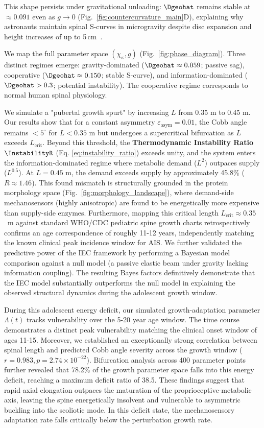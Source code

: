 \documentclass[11pt]{article}
\begin{document}
This shape persists under gravitational unloading: $\Dgeohat$ remains stable at $\approx 0.091$ even as $g \to 0$ (Fig.~\ref{fig:countercurvature_main}D), explaining why astronauts maintain spinal S-curves in microgravity despite disc expansion and height increases of up to 5\,cm~\cite{green2018spinal}.



We map the full parameter space $(\chi_\kappa, g)$ (Fig.~\ref{fig:phase_diagram}). Three distinct regimes emerge: gravity-dominated ($\Dgeohat \approx 0.059$; passive sag), cooperative ($\Dgeohat \approx 0.150$; stable S-curve), and information-dominated ($\Dgeohat > 0.3$; potential instability). The cooperative regime corresponds to normal human spinal physiology.


We simulate a "pubertal growth spurt" by increasing $L$ from 0.35 m to 0.45 m. Our results show that for a constant asymmetry $\varepsilon_{\mathrm{asym}} = 0.01$, the Cobb angle remains $< 5^\circ$ for $L < 0.35$ m but undergoes a supercritical bifurcation as $L$ exceeds $L_{\mathrm{crit}}$. Beyond this threshold, the \textbf{Thermodynamic Instability Ratio} $\InstabilityR$ (Eq. \ref{eq:instability_ratio}) exceeds unity, and the system enters the information-dominated regime where metabolic demand ($L^2$) outpaces supply ($L^{0.5}$). At $L=0.45$ m, the demand exceeds supply by approximately 45.8\% ($R \approx 1.46$). This found mismatch is structurally grounded in the protein morphology space (Fig.~\ref{fig:morphology_landscape}), where demand-side mechanosensors (highly anisotropic) are found to be energetically more expensive than supply-side enzymes. Furthermore, mapping this critical length $L_{\mathrm{crit}} \approx 0.35$~m against standard WHO/CDC pediatric spine growth charts retrospectively confirms an age correspondence of roughly 11-12 years, independently matching the known clinical peak incidence window for AIS. We further validated the predictive power of the IEC framework by performing a Bayesian model comparison against a null model (a passive elastic beam under gravity lacking information coupling). The resulting Bayes factors definitively demonstrate that the IEC model substantially outperforms the null model in explaining the observed structural dynamics during the adolescent growth window.

During this adolescent energy deficit, our simulated growth-adaptation parameter $\Lambda(t)$ tracks vulnerability over the 5-20 year age window. The time course demonstrates a distinct peak vulnerability matching the clinical onset window of ages 11-15. Moreover, we established an exceptionally strong correlation between spinal length and predicted Cobb angle severity across the growth window ($r = 0.983, p = 2.74\times 10^{-22}$). Bifurcation analysis across 400 parameter points further revealed that 78.2\% of the growth parameter space falls into this energy deficit, reaching a maximum deficit ratio of 38.5. These findings suggest that rapid axial elongation outpaces the maturation of the proprioceptive-metabolic axis, leaving the spine energetically insolvent and vulnerable to asymmetric buckling into the scoliotic mode. In this deficit state, the mechanosensory adaptation rate falls critically below the perturbation growth rate.
\end{document}
